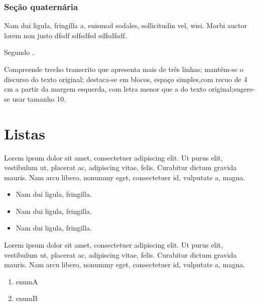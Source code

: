 \subsubsection{Seção quaternária}
Nam dui ligula, fringilla a, euismod sodales, sollicitudin vel, wisi. Morbi auctor lorem non justo dfsdf sdfsdfsd sdfsdfsdf.

Segundo  ,
\begin{citacao}
Compreende trecho transcrito que apresenta mais de três linhas; mantém-se o discurso do texto original; destaca-se em blocos, espaço simples,com recuo de 4 cm a partir da margem esquerda, com letra menor que a do texto original;sugere-se usar tamanho 10.
\end{citacao}

\lipsum[1-1]

\section {Listas}

Lorem ipsum dolor sit amet, consectetuer adipiscing elit. Ut purus elit, vestibulum ut, placerat ac, adipiscing vitae, felis. Curabitur dictum gravida mauris. Nam arcu libero, nonummy eget, consectetuer id, vulputate a, magna.

\begin{itemize}
\item Nam dui ligula, fringilla.
\item Nam dui ligula, fringilla.
\item Nam dui ligula, fringilla.
\end{itemize}

Lorem ipsum dolor sit amet, consectetuer adipiscing elit. Ut purus elit, vestibulum ut, placerat ac, adipiscing vitae, felis. Curabitur dictum gravida mauris. Nam arcu libero, nonummy eget, consectetuer id, vulputate a, magna.

\begin{enumerate}
 \item enumA
 \item enumB
\end{enumerate}

